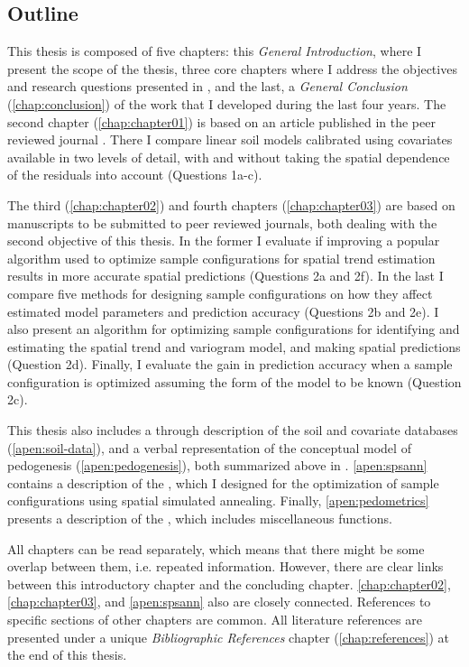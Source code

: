 \subsection{Outline}
\label{sec:thesis-outline}

This thesis is composed of five chapters: this \emph{General Introduction}, where I present the scope
of the thesis, three core chapters where I address the objectives and research questions presented
in , and the last, a \emph{General Conclusion} (\autoref{chap:conclusion})
of the work that I developed during the last four years. The second chapter (\autoref{chap:chapter01})
is based on an article published in the peer reviewed journal \geoderma. There I compare linear
soil models calibrated using covariates available in two levels of detail, with and without
taking the spatial dependence of the residuals into account (Questions 1a-c).

The third (\autoref{chap:chapter02}) and fourth chapters (\autoref{chap:chapter03}) are based on
manuscripts to be submitted to peer reviewed journals, both dealing with the second objective of this
thesis. In the former I evaluate if improving a popular algorithm used to optimize sample configurations
for spatial trend estimation results in more accurate spatial predictions (Questions 2a and 2f). In the
last I compare five methods for designing sample configurations on how they affect estimated model
parameters and prediction accuracy (Questions 2b and 2e). I also present an algorithm for optimizing
sample configurations for identifying and estimating the spatial trend and variogram model, and making
spatial predictions (Question 2d). Finally, I evaluate the gain in prediction accuracy when a sample
configuration is optimized assuming the form of the model to be known (Question 2c).

This thesis also includes a through description of the soil and covariate databases
(\autoref{apen:soil-data}), and a verbal representation of the conceptual model of pedogenesis
(\autoref{apen:pedogenesis}), both summarized above in . \autoref{apen:spsann} contains
a description of the , which I designed for the optimization of sample configurations
using spatial simulated annealing. Finally, \autoref{apen:pedometrics} presents a description of the
, which includes miscellaneous functions.

All chapters can be read separately, which means that there might be some overlap between them,
i.e. repeated information. However, there are clear links between this introductory chapter
and the concluding chapter. \autoref{chap:chapter02}, \autoref{chap:chapter03}, and \autoref{apen:spsann}
also are closely connected. References to specific sections of other chapters are common. All literature
references are presented under a unique \emph{Bibliographic References} chapter (\autoref{chap:references})
at the end of this thesis.
